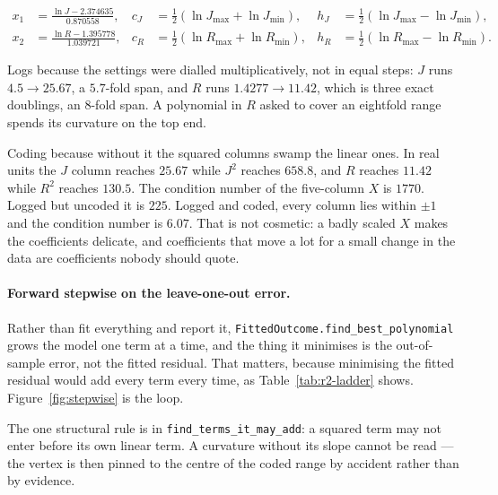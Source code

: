 \begin{align}
  x_1 &= \frac{\ln J - 2.374635}{0.870558},
  & c_J &= \tfrac12(\ln J_{\max} + \ln J_{\min}),
  & h_J &= \tfrac12(\ln J_{\max} - \ln J_{\min}), \\
  x_2 &= \frac{\ln R - 1.395778}{1.039721},
  & c_R &= \tfrac12(\ln R_{\max} + \ln R_{\min}),
  & h_R &= \tfrac12(\ln R_{\max} - \ln R_{\min}).
\end{align}

Logs because the settings were dialled multiplicatively, not in equal steps: $J$ runs
$4.5 \to 25.67$, a $5.7$-fold span, and $R$ runs $1.4277 \to 11.42$, which is three exact
doublings, an $8$-fold span. A polynomial in $R$ asked to cover an eightfold range spends its
curvature on the top end.

Coding because without it the squared columns swamp the linear ones. In real units the $J$
column reaches $25.67$ while $J^{2}$ reaches $658.8$, and $R$ reaches $11.42$ while $R^{2}$
reaches $130.5$. The condition number of the five-column $X$ is $1770$. Logged but uncoded it is
$225$. Logged and coded, every column lies within $\pm 1$ and the condition number is $6.07$.
That is not cosmetic: a badly scaled $X$ makes the coefficients delicate, and coefficients that
move a lot for a small change in the data are coefficients nobody should quote.

\paragraph{Forward stepwise on the leave-one-out error.} Rather than fit everything and report
it, \texttt{FittedOutcome\allowbreak{}.find\_best\_polynomial} grows the model one term at a
time, and the thing it minimises is the out-of-sample error, not the fitted residual. That
matters, because minimising the fitted residual would add every term every time, as
Table~\ref{tab:r2-ladder} shows. Figure~\ref{fig:stepwise} is the loop.

The one structural rule is in \texttt{find\_terms\_it\_may\_add}: a squared term may not enter
before its own linear term. A curvature without its slope cannot be read --- the vertex is then
pinned to the centre of the coded range by accident rather than by evidence.

